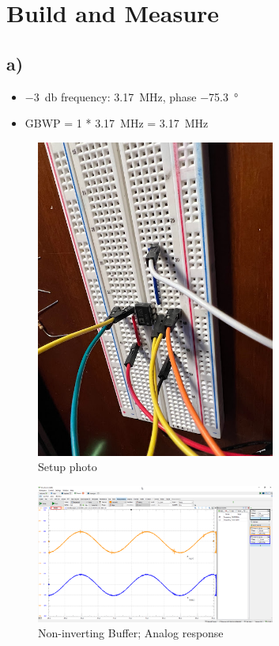 \documentclass{article}
\begin{document}
	\section{Build and Measure}
	
	\subsection*{a)}
	
	\begin{itemize}
		\item \SI{-3}{\decibel} frequency: \SI{3.17}{\mega\hertz}, phase \SI{-75.3}{\degree}
		\item GBWP = 1 * \SI{3.17}{\mega\hertz} = \SI{3.17}{\mega\hertz}
	\end{itemize}
	
	\begin{figure}[H]
	    \centering
	    \includegraphics[width=0.7\textwidth]{2a-photo}
	    \caption{Setup photo}
	\end{figure}

	\begin{figure}[H]
	    \centering
	    \includegraphics[width=0.7\textwidth]{2a-1}
	    \caption{Non-inverting Buffer; Analog response}
	\end{figure}
\end{document}
